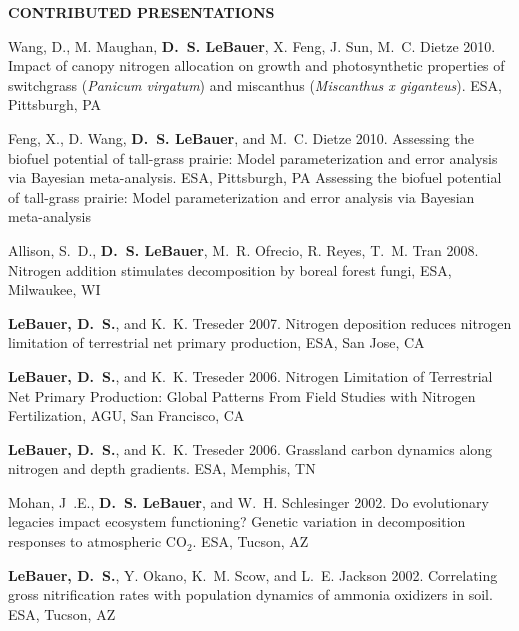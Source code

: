 \documentclass[12pt,twoside]{article}
\begin{document}
{\textbf{CONTRIBUTED PRESENTATIONS}\\
\begin{itemize*}
\item Wang, D., M. Maughan, \textbf{D.~S. LeBauer}, X. Feng, J. Sun, M.~C. Dietze 2010. Impact of canopy nitrogen allocation on growth and photosynthetic properties of switchgrass (\textit{Panicum virgatum}) and miscanthus (\textit{Miscanthus x giganteus}). ESA, Pittsburgh, PA
\item Feng, X., D. Wang, \textbf{D.~S. LeBauer}, and M.~C. Dietze 2010. Assessing the biofuel potential of tall-grass prairie: Model parameterization and error analysis via Bayesian meta-analysis. ESA, Pittsburgh, PA 
Assessing the biofuel potential of tall-grass prairie: Model parameterization and error analysis via Bayesian meta-analysis
\item Allison, S.~D., \textbf{D.~S. LeBauer}, M.~R. Ofrecio, R. Reyes, T.~M. Tran 2008. Nitrogen addition stimulates decomposition by boreal forest fungi, ESA, Milwaukee, WI
\item  \textbf{LeBauer, D.~S.}, and K.~K. Treseder 2007. Nitrogen deposition reduces nitrogen limitation of terrestrial net primary production, ESA, San Jose, CA
\item \textbf{LeBauer, D.~S.}, and K.~K. Treseder 2006. Nitrogen Limitation of Terrestrial Net Primary Production: Global Patterns From Field Studies with Nitrogen Fertilization, AGU, San Francisco, CA
\item \textbf{LeBauer, D.~S.}, and K.~K. Treseder 2006. Grassland carbon dynamics along nitrogen and depth gradients. ESA, Memphis, TN
\item Mohan, J~.E., \textbf{D.~S. LeBauer}, and W.~H. Schlesinger 2002. Do evolutionary legacies impact ecosystem functioning? Genetic variation in decomposition responses to atmospheric CO$_2$. ESA, Tucson, AZ
\item \textbf{LeBauer, D.~S.}, Y. Okano, K.~M. Scow, and L.~E. Jackson 2002. Correlating gross nitrification rates with population dynamics of ammonia oxidizers in soil. ESA, Tucson, AZ

\end{itemize*}

}
\end{document}
